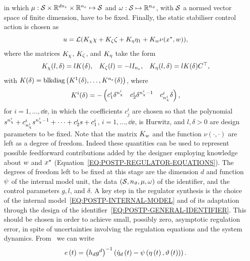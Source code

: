 in which $\mu : \mathcal{S} \times \mathbb{R}^{d n_{e}} \times \mathbb{R}^{n_{e}} \mapsto \mathcal{S}$ and $\omega : \mathcal{S} \mapsto \mathbb{R}^{n_{\vartheta}}$, with $\mathcal{S}$ a 
normed vector space of finite dimension, have to be fixed. Finally, the static stabiliser control action is chosen as
\begin{equation*}%
   \uu = \LL(K_{\chain}\chain + K_{\last}\last + K_{\im}\im_1 + K_{\ww} \nu(\xx\s, \ww)),
\end{equation*}
where the matrices $K_{\chi}$, $K_{\zeta}$, and $K_{\eta}$ take the form
\begin{equation*}
   \begin{matrix}
      K_{\chi}(l,\delta) = lK(\delta), & K_{\zeta}(l) = -lI_{n_{e}}, & K_{\eta}(l,\delta) = lK(\delta)C^{\top},
   \end{matrix}
\end{equation*}
with $K(\delta) = \text{blkdiag} \left( K^1(\delta), \dots, K^{n_{e}}(\delta)\right)$, where
\begin{equation*}
   K^i(\delta) = - \left( 
   \begin{matrix} 
      c_1^i \delta^{n_{\chi}^i} & c_2^i \delta^{n_{\chi}^i - 1} & c_{n_{\chi}^i}^i \delta 
   \end{matrix} \right),
\end{equation*}
for $i = 1, \dots, \dd{\ee}$, in which the coefficients $c_j^i$ are chosen so that the polynomial
$s^{n_{\chi}^i} + c^i_{n_{\chi}^i}s^{n_{\chi}^i - 1} + \cdots + c_2^i s + c_1^i$, $i = 1, \dots, \dd{\ee}$,
is Hurwitz, and $l, \delta > 0$ are design parameters to be fixed.
Note that the matrix $K_{w}$ and the function $\nu(\cdot, \cdot)$ are left as a degree of freedom.
Indeed these quantities can be used to represent possible feedforward contributions added by the
designer employing knowledge about $w$ and $x^{\star}$ (Equation~\eqref{EQ:POSTP-REGULATOR-EQUATIONS}).
The degrees of freedom left to be fixed at this stage are the dimension $d$ and function $\psi$ of the internal model unit,
the data $\left( \mathcal{S}, n_{\vartheta}, \mu, \omega \right)$ of the identifier, and the control parameters $g, l$, and $\delta$.
A key step in the regulator synthesis is the choice of the internal model~\eqref{EQ:POSTP-INTERNAL-MODEL}
and of its adaptation through the design of the identifier~\eqref{EQ:POSTP-GENERAL-IDENTIFIER}.
This should be chosen in order to achieve small, possibly zero, asymptotic regulation error,
in spite of uncertainties involving the regulation equations and the system dynamics.
From~ we can write
\begin{equation}%
   \label{EQ:POSTP-REGULATION-ERROR}
   \ee \lp t \rp = \lp h_d g^d \rp^{-1} \lp \dot{\im}_d \lp t \rp - \imfunsingle \lp \im \lp t \rp, \param \lp t \rp \rp \rp.
\end{equation}
